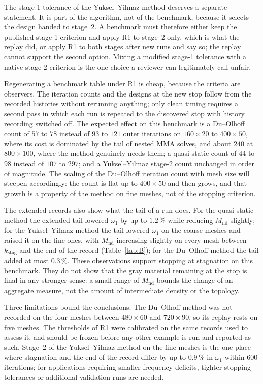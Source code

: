 \documentclass[11pt,a4paper]{article}
\newcommand{\Mnd}{M_{\mathrm{nd}}}
\newcommand{\kstag}{k_{\mathrm{stag}}}
\newcommand{\me}[2]{$#1\times#2$}
\begin{document}
The stage-1 tolerance of the Yuksel--Yilmaz method deserves a separate statement. It is part of the algorithm, not of the benchmark, because it selects the design handed to stage~2. A benchmark must therefore either keep the published stage-1 criterion and apply R1 to stage~2 only, which is what the replay did, or apply R1 to both stages after new runs and say so; the replay cannot support the second option. Mixing a modified stage-1 tolerance with a native stage-2 criterion is the one choice a reviewer can legitimately call unfair.

Regenerating a benchmark table under R1 is cheap, because the criteria are observers. The iteration counts and the designs at the new stop follow from the recorded histories without rerunning anything; only clean timing requires a second pass in which each run is repeated to the discovered stop with history recording switched off. The expected effect on this benchmark is a Du--Olhoff count of $57$ to $78$ instead of $93$ to $121$ outer iterations on \me{160}{20} to \me{400}{50}, where its cost is dominated by the tail of nested MMA solves, and about $240$ at \me{800}{100}, where the method genuinely needs them; a quasi-static count of $44$ to $98$ instead of $107$ to $297$; and a Yuksel--Yilmaz stage-2 count unchanged in order of magnitude. The scaling of the Du--Olhoff iteration count with mesh size will steepen accordingly: the count is flat up to \me{400}{50} and then grows, and that growth is a property of the method on fine meshes, not of the stopping criterion.

The extended records also show what the tail of a run does. For the quasi-static method the extended tail lowered $\omega_1$ by up to $1.2\,\%$ while reducing $\Mnd$ slightly; for the Yuksel--Yilmaz method the tail lowered $\omega_1$ on the coarse meshes and raised it on the fine ones, with $\Mnd$ increasing slightly on every mesh between $\kstag$ and the end of the record (Table~\ref{tab:B}); for the Du--Olhoff method the tail added at most $0.3\,\%$. These observations support stopping at stagnation on this benchmark. They do not show that the gray material remaining at the stop is final in any stronger sense: a small range of $\Mnd$ bounds the change of an aggregate measure, not the amount of intermediate density or the topology.

Three limitations bound the conclusions. The Du--Olhoff method was not recorded on the four meshes between \me{480}{60} and \me{720}{90}, so its replay rests on five meshes. The thresholds of R1 were calibrated on the same records used to assess it, and should be frozen before any other example is run and reported as such. Stage~2 of the Yuksel--Yilmaz method on the fine meshes is the one place where stagnation and the end of the record differ by up to $0.9\,\%$ in $\omega_1$ within 600 iterations; for applications requiring smaller frequency deficits, tighter stopping tolerances or additional validation runs are needed.
\end{document}
